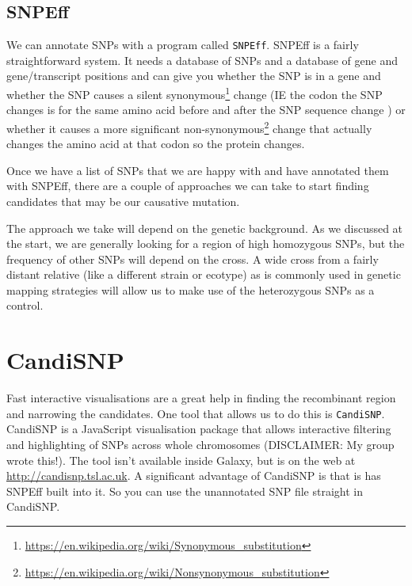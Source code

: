\documentclass[12pt,]{book}
\let\rmarkdownfootnote\footnote%
\def\footnote{\protect\rmarkdownfootnote}
\renewcommand{\href}[2]{#2\footnote{\url{#1}}}
\theoremstyle{definition}
\theoremstyle{definition}
\theoremstyle{remark}
\begin{document}
\subsection{SNPEff}\label{snpeff}

We can annotate SNPs with a program called \texttt{SNPEff}. SNPEff
\citep{Cingolani:2012cz} is a fairly straightforward system. It needs a
database of SNPs and a database of gene and gene/transcript positions
and can give you whether the SNP is in a gene and whether the SNP causes
a silent
\href{https://en.wikipedia.org/wiki/Synonymous_substitution}{synonymous}
change (IE the codon the SNP changes is for the same amino acid before
and after the SNP sequence change ) or whether it causes a more
significant
\href{https://en.wikipedia.org/wiki/Nonsynonymous_substitution}{non-synonymous}
change that actually changes the amino acid at that codon so the protein
changes.

Once we have a list of SNPs that we are happy with and have annotated
them with SNPEff, there are a couple of approaches we can take to start
finding candidates that may be our causative mutation.

The approach we take will depend on the genetic background. As we
discussed at the start, we are generally looking for a region of high
homozygous SNPs, but the frequency of other SNPs will depend on the
cross. A wide cross from a fairly distant relative (like a different
strain or ecotype) as is commonly used in genetic mapping strategies
will allow us to make use of the heterozygous SNPs as a control.

\section{CandiSNP}\label{candisnp}

Fast interactive visualisations are a great help in finding the
recombinant region and narrowing the candidates. One tool that allows us
to do this is \texttt{CandiSNP}. CandiSNP \citep{Etherington:2014ba} is
a JavaScript visualisation package that allows interactive filtering and
highlighting of SNPs across whole chromosomes (DISCLAIMER: My group
wrote this!). The tool isn't available inside Galaxy, but is on the web
at \url{http://candisnp.tsl.ac.uk}. A significant advantage of CandiSNP
is that is has SNPEff built into it. So you can use the unannotated SNP
file straight in CandiSNP.
\end{document}
